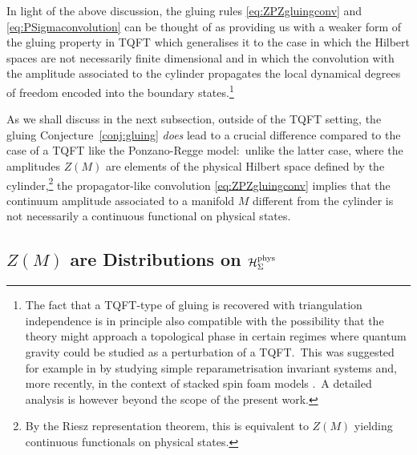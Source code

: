\documentclass[11pt]{article}
\newcommand{\Hphys}{\mathcal{H}_{\Sigma}^{\rm phys}}
\theoremstyle{definition}
\numberwithin{equation}{section}
\begin{document}
In light of the above discussion, the gluing rules \eqref{eq:ZPZgluingconv} and \eqref{eq:PSigmaconvolution} can be thought of as providing us with a weaker form of the gluing property in TQFT which generalises it to the case in which the Hilbert spaces are not necessarily finite dimensional and in which the convolution with the amplitude associated to the cylinder propagates the local dynamical degrees of freedom encoded into the boundary states.\footnote{The fact that a TQFT-type of gluing is recovered with triangulation independence is in principle also compatible with the possibility that the theory might approach a topological phase in certain regimes where quantum gravity could be studied as a perturbation of a TQFT.~This was suggested for example in \cite{Rovelli_2022} by studying simple reparametrisation invariant systems and, more recently, in the context of stacked spin foam models \cite{Han:2025emp,Han:2026hyq}.~A detailed analysis is however beyond the scope of the present work.}   

As we shall discuss in the next subsection, outside of the TQFT setting, the gluing Conjecture~\ref{conj:gluing} \emph{does} lead to a crucial difference compared to the case of a TQFT like the Ponzano-Regge model:~unlike the latter case, where the amplitudes $Z(M)$ are elements of the physical Hilbert space defined by the cylinder,\footnote{By the Riesz representation theorem, this is equivalent to $Z(M)$ yielding continuous functionals on physical states.} the propagator-like convolution \eqref{eq:ZPZgluingconv} implies that the continuum amplitude associated to a manifold $M$ different from the cylinder is not necessarily a continuous functional on physical states. 

\subsection{\texorpdfstring{$Z(M)$}{Z(M)} are Distributions on \texorpdfstring{$\Hphys$}{\mathcal H\^phys\_Sigma}}
\end{document}
